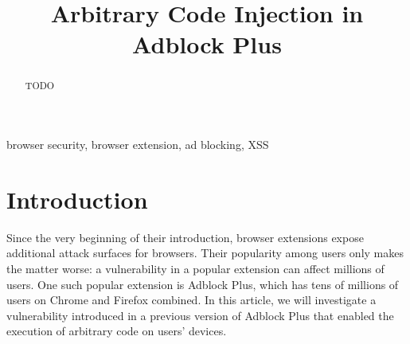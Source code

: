 \documentclass[conference]{IEEEtran}
\begin{document}
\title{Arbitrary Code Injection in Adblock Plus
}

\author{
\and
{}
\and
{}
}

\maketitle

\begin{abstract}
TODO
\end{abstract}

\begin{IEEEkeywords}
browser security, browser extension, ad blocking, XSS
\end{IEEEkeywords}

\section{Introduction}
Since the very beginning of their introduction, browser extensions expose additional attack surfaces for browsers. Their popularity among users only makes the matter worse: a vulnerability in a popular extension can affect millions of users. One such popular extension is Adblock Plus, which has tens of millions of users on Chrome and Firefox combined. \cite{noauthor_adblockchrome_nodate, noauthor_adblockfirefox_nodate} In this article, we will investigate a vulnerability introduced in a previous version of Adblock Plus that enabled the execution of arbitrary code on users' devices.
\end{document}
